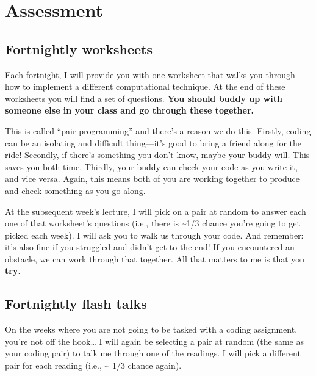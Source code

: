 \documentclass[
  letterpaper,
  DIV=11,
  numbers=noendperiod]{scrreprt}
\begin{document}
\hypertarget{assessment}{%
\section*{Assessment}\label{assessment}}

\hypertarget{fortnightly-worksheets}{%
\subsection*{Fortnightly worksheets}\label{fortnightly-worksheets}}

Each fortnight, I will provide you with one worksheet that walks you
through how to implement a different computational technique. At the end
of these worksheets you will find a set of questions. \textbf{You should
buddy up with someone else in your class and go through these together.}

This is called ``pair programming'' and there's a reason we do this.
Firstly, coding can be an isolating and difficult thing---it's good to
bring a friend along for the ride! Secondly, if there's something you
don't know, maybe your buddy will. This saves you both time. Thirdly,
your buddy can check your code as you write it, and vice versa. Again,
this means both of you are working together to produce and check
something as you go along.

At the subsequent week's lecture, I will pick on a pair at random to
answer each one of that worksheet's questions (i.e., there is
\textasciitilde1/3 chance you're going to get picked each week). I will
ask you to walk us through your code. And remember: it's also fine if
you struggled and didn't get to the end! If you encountered an obstacle,
we can work through that together. All that matters to me is that you
\textbf{try}.

\hypertarget{fortnightly-flash-talks}{%
\subsection*{Fortnightly flash talks}\label{fortnightly-flash-talks}}

On the weeks where you are not going to be tasked with a coding
assignment, you're not off the hook\ldots{} I will again be selecting a
pair at random (the same as your coding pair) to talk me through one of
the readings. I will pick a different pair for each reading (i.e.,
\textasciitilde{} 1/3 chance again).
\end{document}
